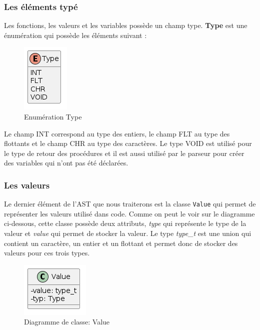\documentclass[a4paper]{article}%
\begin{document}
\subsubsection*{Les éléments typé}
\label{sec:eltTypes}

Les fonctions, les valeurs et les variables possède un champ type. \textbf{Type}
est une énumération qui possède les éléments suivant :

\begin{figure}[h!]
  \begin{center}
  \includegraphics[scale=0.5]{../ressources/diagrams/Type.png}
  \caption{Enumération Type}
  \end{center}
\end{figure}

Le champ INT correspond au type des entiers, le champ FLT au type des flottants
et le champ CHR au type des caractères. Le type VOID est utilisé pour le type de
retour des procédures et il est aussi utilisé par le parseur pour créer des
variables qui n'ont pas été déclarées.

\subsubsection*{Les valeurs}

Le dernier élément de l'AST que nous traiterons est la classe \lstinline{Value}
qui permet de représenter les valeurs utilisé dans code. Comme on peut le voir
sur le diagramme ci-dessous, cette classe possède deux attributs, \textit{type}
qui représente le type de la valeur et \textit{value} qui permet de stocker la
valeur. Le type \textit{type\_t} est une union qui contient un caractère, un
entier et un flottant et permet donc de stocker des valeurs pour ces trois
types.

\begin{figure}[h!]
  \begin{center}
  \includegraphics[scale=0.5]{../ressources/diagrams/value.png}
  \caption{Diagramme de classe: Value}
  \end{center}
\end{figure}
~\\
\end{document}
